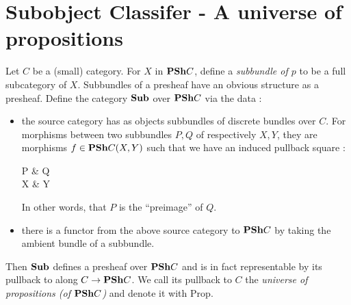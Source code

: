 \documentclass{article}
\begin{document}
\section{Subobject Classifer - A universe of propositions}

\begin{prop}

  Let $C$ be a (small) category.
  For $X$ in $\mathbf{PSh} C$,
  define a \emph{subbundle of $p$} to be a full subcategory of $X$.
  Subbundles of a presheaf have an obvious structure as a presheaf.
  Define the category $\mathbf{Sub}$ over $\mathbf{PSh} C$ via the data :
  \begin{itemize}
    \item the source category has as objects 
    subbundles of discrete bundles over $ C$.
    For morphisms between two subbundles $P, Q$ of 
    respectively $X, Y$,
    they are morphisms $f \in \mathbf{PSh} C(X,Y)$ such that
    we have an induced pullback square : 
    \begin{cd}
      P & Q \\
      X & Y
      \arrow[from=2-1, to=2-2, "f"{swap}]
      \arrow[from=1-1, to=2-1]
      \arrow[from=1-1, to=1-2]
      \arrow[from=1-2, to=2-2]
      \arrow["\lrcorner"{anchor=center, pos=0.125}, draw=none, from=1-1, to=2-2]
    \end{cd}
    In other words, that $P$ is the ``preimage'' of $Q$.
    \item there is a functor from the above source category to $\mathbf{PSh} C$
    by taking the ambient bundle of a subbundle.
  \end{itemize} 
  Then $\mathbf{Sub}$ defines a presheaf over $\mathbf{PSh} C$ and is in fact
  representable by its pullback to along $ C \to \mathbf{PSh} C$.
  We call its pullback to $C$ the 
  \emph{universe of propositions (of $\mathbf{PSh} C$)}
  and denote it with $\mathrm{Prop}$.
\end{prop}
\end{document}
